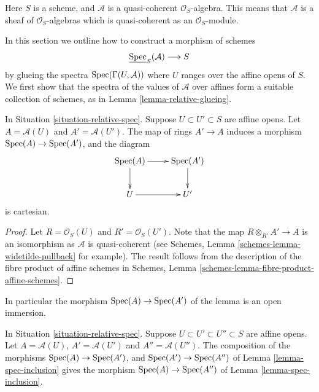\begin{situation}
\label{situation-relative-spec}
Here $S$ is a scheme, and $\mathcal{A}$ is a quasi-coherent
$\mathcal{O}_S$-algebra. This means that $\mathcal{A}$ is a
sheaf of $\mathcal{O}_S$-algebras which is quasi-coherent as an
$\mathcal{O}_S$-module.
\end{situation}

\noindent
In this section we outline how to construct a morphism
of schemes
$$
\underline{\mathop{\mathrm{Spec}}}_S(\mathcal{A}) \longrightarrow S
$$
by glueing the spectra $\mathop{\mathrm{Spec}}(\Gamma(U, \mathcal{A}))$
where $U$ ranges over the affine opens of $S$. We first show that the
spectra of the values of $\mathcal{A}$ over affines form a
suitable collection of schemes, as in Lemma \ref{lemma-relative-glueing}.

\begin{lemma}
\label{lemma-spec-inclusion}
In Situation \ref{situation-relative-spec}.
Suppose $U \subset U' \subset S$ are affine opens.
Let $A = \mathcal{A}(U)$ and $A' = \mathcal{A}(U')$.
The map of rings $A' \to A$ induces a morphism
$\mathop{\mathrm{Spec}}(A) \to \mathop{\mathrm{Spec}}(A')$, and the diagram
$$
\xymatrix{
\Spec(A) \ar[r] \ar[d] &
\Spec(A') \ar[d] \\
U \ar[r] &
U'
}
$$
is cartesian.
\end{lemma}

\begin{proof}
Let $R = \mathcal{O}_S(U)$ and $R' = \mathcal{O}_S(U')$.
Note that the map $R \otimes_{R'} A' \to A$ is an isomorphism as
$\mathcal{A}$ is quasi-coherent
(see Schemes, Lemma \ref{schemes-lemma-widetilde-pullback} for example).
The result follows from the description of the fibre product of
affine schemes in
Schemes, Lemma \ref{schemes-lemma-fibre-product-affine-schemes}.
\end{proof}

\noindent
In particular the morphism $\mathop{\mathrm{Spec}}(A) \to \mathop{\mathrm{Spec}}(A')$
of the lemma is an open immersion.

\begin{lemma}
\label{lemma-transitive-spec}
In Situation \ref{situation-relative-spec}.
Suppose $U \subset U' \subset U'' \subset S$ are affine opens.
Let $A = \mathcal{A}(U)$, $A' = \mathcal{A}(U')$ and $A'' = \mathcal{A}(U'')$.
The composition of the morphisms
$\mathop{\mathrm{Spec}}(A) \to \mathop{\mathrm{Spec}}(A')$, and
$\mathop{\mathrm{Spec}}(A') \to \mathop{\mathrm{Spec}}(A'')$ of
Lemma \ref{lemma-spec-inclusion} gives the
morphism $\mathop{\mathrm{Spec}}(A) \to \mathop{\mathrm{Spec}}(A'')$
of Lemma \ref{lemma-spec-inclusion}.
\end{lemma}

